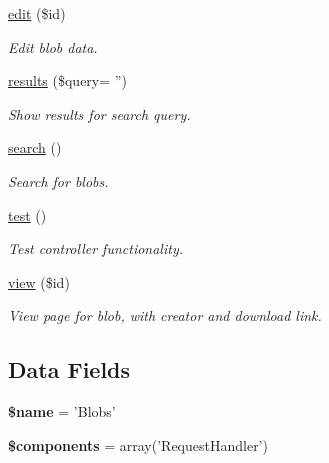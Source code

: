 \begin{DoxyCompactItemize}
\hyperlink{class_blobs_controller_a459ed16587e3a50b39b672c7e473abc5}{edit} (\$id)
\begin{DoxyCompactList}\small\item\em Edit blob data. \item\end{DoxyCompactList}\item 
\hyperlink{class_blobs_controller_ab633a32e024a1dc81243c199d7a8e4d7}{results} (\$query= '')
\begin{DoxyCompactList}\small\item\em Show results for search query. \item\end{DoxyCompactList}\item 
\hyperlink{class_blobs_controller_a796bf438724e047aeef18579732a3780}{search} ()
\begin{DoxyCompactList}\small\item\em Search for blobs. \item\end{DoxyCompactList}\item 
\hypertarget{class_blobs_controller_ad69dd4607977cae05ebe19d1ae604fb1}{
\hyperlink{class_blobs_controller_ad69dd4607977cae05ebe19d1ae604fb1}{test} ()}
\label{class_blobs_controller_ad69dd4607977cae05ebe19d1ae604fb1}

\begin{DoxyCompactList}\small\item\em Test controller functionality. \item\end{DoxyCompactList}\item 
\hyperlink{class_blobs_controller_a93a99cdd06e6a3044ed7e56db0f9419a}{view} (\$id)
\begin{DoxyCompactList}\small\item\em View page for blob, with creator and download link. \item\end{DoxyCompactList}\end{DoxyCompactItemize}
\subsection*{Data Fields}
\begin{DoxyCompactItemize}
\item 
\hypertarget{class_blobs_controller_ab2fc40d43824ea3e1ce5d86dee0d763b}{
{\bfseries \$name} = 'Blobs'}
\label{class_blobs_controller_ab2fc40d43824ea3e1ce5d86dee0d763b}

\item 
\hypertarget{class_blobs_controller_a2409c247baf67a1d4c6b9a1789cfc088}{
{\bfseries \$components} = array('RequestHandler')}
\label{class_blobs_controller_a2409c247baf67a1d4c6b9a1789cfc088}

\end{DoxyCompactItemize}


